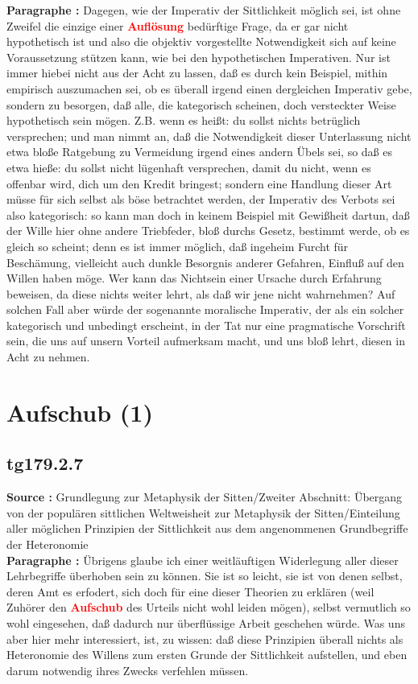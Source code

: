 \documentclass[a4paper,12pt,twoside]{book}
\newcommand{\match}[1]{\textcolor{red}{\textbf{#1}}}
\newcommand{\unnumberedsection}[1]{
	\section*{#1}
	\addcontentsline{toc}{section}{#1}
	\markright{#1}
}
\begin{document}
	\noindent\textbf{Paragraphe : }Dagegen, wie der Imperativ der Sittlichkeit möglich sei, ist ohne Zweifel die einzige einer \match{Auflösung} bedürftige Frage, da er gar nicht hypothetisch ist und also die objektiv vorgestellte Notwendigkeit sich auf keine Voraussetzung stützen kann, wie bei den hypothetischen Imperativen. Nur ist immer hiebei nicht aus der Acht zu lassen, daß es durch kein Beispiel, mithin empirisch auszumachen sei, ob es überall irgend einen dergleichen Imperativ gebe, sondern zu besorgen, daß alle, die kategorisch scheinen, doch versteckter Weise hypothetisch sein mögen. Z.B. wenn es heißt: du sollst nichts betrüglich versprechen; und man nimmt an, daß die Notwendigkeit dieser Unterlassung nicht etwa bloße Ratgebung zu Vermeidung irgend eines andern Übels sei, so daß es etwa hieße: du sollst nicht lügenhaft versprechen, damit du nicht, wenn es offenbar wird, dich um den Kredit bringest; sondern eine Handlung dieser Art müsse für sich selbst als böse betrachtet werden, der Imperativ des Verbots sei also kategorisch: so kann man doch in keinem Beispiel mit Gewißheit dartun, daß der Wille hier ohne andere Triebfeder, bloß durchs Gesetz, bestimmt werde, ob es gleich so scheint; denn es ist immer möglich, daß ingeheim Furcht für Beschämung, vielleicht auch dunkle Besorgnis anderer Gefahren, Einfluß auf den Willen haben möge. Wer kann das Nichtsein einer Ursache durch Erfahrung beweisen, da diese nichts weiter lehrt, als daß wir jene nicht wahrnehmen? Auf solchen Fall aber würde der sogenannte moralische Imperativ, der als ein solcher kategorisch und unbedingt erscheint, in der Tat nur eine pragmatische Vorschrift sein, die uns auf unsern Vorteil aufmerksam macht, und uns bloß lehrt, diesen in Acht zu nehmen. 
	
	\unnumberedsection{Aufschub (1)} 
	\subsection*{tg179.2.7} 
	\textbf{Source : }Grundlegung zur Metaphysik der Sitten/Zweiter Abschnitt: Übergang von der populären sittlichen Weltweisheit zur Metaphysik der Sitten/Einteilung aller möglichen Prinzipien der Sittlichkeit aus dem angenommenen Grundbegriffe der Heteronomie\\  
	
	\noindent\textbf{Paragraphe : }Übrigens glaube ich einer weitläuftigen Widerlegung aller dieser Lehrbegriffe überhoben sein zu können. Sie ist so leicht, sie ist von denen selbst, deren Amt es erfodert, sich doch für eine dieser Theorien zu erklären (weil Zuhörer den \match{Aufschub} des Urteils nicht wohl leiden mögen), selbst vermutlich so wohl eingesehen, daß dadurch nur überflüssige Arbeit geschehen würde. Was uns aber hier mehr interessiert, ist, zu wissen: daß diese Prinzipien überall nichts als Heteronomie des Willens zum ersten Grunde der Sittlichkeit  aufstellen, und eben darum notwendig ihres Zwecks verfehlen müssen. 
	
\end{document}
